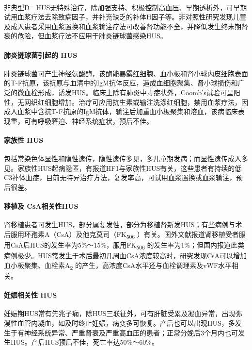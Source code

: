 非典型D\textsuperscript{−}
HUS无特殊治疗，除加强支持、积极控制高血压、早期透析外，可早期试用血浆疗法去除致病因子，并补充缺乏的补体H因子等。非对照性研究发现儿童及成人患者采用血浆置换和血浆输注疗法可改善肾功能不全，并降低发生终末期肾衰的危险，但血浆疗法不应用于肺炎链球菌感染HUS。

\paragraph{肺炎链球菌引起的 HUS}

肺炎链球菌可产生神经氨酸酶，该酶能暴露红细胞、血小板和肾小球内皮细胞表面的T-F抗原，该抗原与血清中的IgM抗体反应，造成血细胞聚集、肾小球损伤和广泛的微血栓形成，诱发HUS。临床上除有肺炎中毒症状外，Coomb's试验可呈阳性，无网织红细胞增加。治疗可应用抗生素或输注洗涤红细胞，禁用血浆疗法，因成人血浆中含抗T-F抗原的IgM抗体，输注后加重血小板聚集和溶血，该病临床表现重，可有呼吸窘迫、神经系统症状，预后不佳。

\paragraph{家族性 HUS}

包括常染色体显性和隐性遗传，隐性遗传多见，多儿童期发病；而显性遗传成人多见。家族性HUS起病隐匿，有报道HF1与家族性HUS有关，这些患者有持续的低C3补体血症，目前无特异治疗方法，复发率高，可试用血浆置换或血浆输注，预后很差。

\paragraph{移植及 CsA相关性HUS}

肾移植患者可发生HUS，部分属复发性，部分为移植肾新发HUS；有些病例与术后服用环孢素A（CsA）及他克莫司（FK\textsubscript{506}
）有关。国外文献报道肾移植受者服用CsA后HUS的发生率为5\%～15\%，服用FK\textsubscript{506}
的发生率为1\%；但国内报道此类病例极少。HUS常发生于术后最初几周血CsA浓度较高时，研究发现CsA可以增加血小板聚集、血栓素A\textsubscript{2}
的产生，高浓度CsA水平还与血栓调理素及vWF水平相关。

\paragraph{妊娠相关性 HUS}

妊娠期HUS常有先兆子痫，除HUS三联征外，可有肝脏受累及凝血异常，出现弥漫性血管内凝血，如及时终止妊娠，病变多可恢复。产后也可以出现HUS，多发生于有神经系统异常、严重肾衰及严重高血压的患者；正常分娩后3个月内也可发生HUS。产后HUS预后不佳，死亡率达50\%～60\%。

